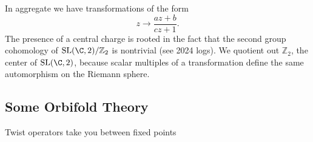 \documentclass{report}
\begin{document}
In aggregate we have transformations of the form 
\begin{equation*}
	z \rightarrow \frac{az + b}{cz + 1}.
\end{equation*}
The presence of a central charge is rooted in the fact that the second group 
cohomology of $ \text{SL}(\C, 2)/\mathbb{Z}_2 $ is nontrivial (see 2024 logs).
We quotient out $ \mathbb{Z}_2 $, the center of $ \text{SL}(\C, 2) $, because 
scalar multiples of a transformation define the same automorphism on the Riemann
sphere.  

\subsection{Some Orbifold Theory}

Twist operators take you between fixed points
\end{document}
